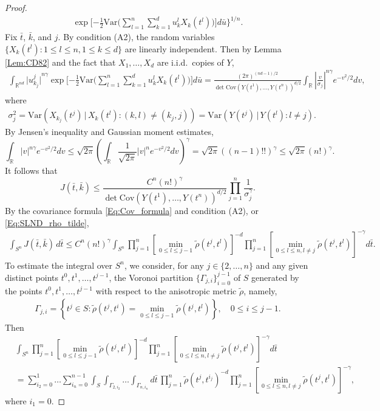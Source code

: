 \documentclass[11pt, reqno]{amsart}
\def\R{{\mathbb R}}
\numberwithin{equation}{section}
\begin{document}
\begin{proof}
\begin{align*}
\exp\Bigg[{-\frac{1}{2}\mathrm{Var}\Bigg(\sum_{l=1}^n\sum_{k=1}^d u_k^l X_k(t^l)\Bigg)}\Bigg] d\bar{u} \Bigg\}^{1/n}.
\end{align*}
Fix $\bar{t}$, $\bar{k}$, and $j$.
By condition (A2), the random variables $\{X_k(t^l) : 1 \le l \le n, 1 \le k \le d\}$ are linearly independent.
Then by Lemma \ref{Lem:CD82} and the fact that $X_1, \dots, X_d$ are i.i.d.~copies of $Y$,
\begin{align*}
\int_{\R^{nd}} {\big|u_{k_j}^j\big|}^{n\gamma} \exp\Bigg[{-\frac{1}{2}\mathrm{Var}\Bigg(\sum_{l=1}^n\sum_{k=1}^d u_k^l 
X_k(t^l)\Bigg)}\Bigg] d\bar{u}
= \frac{(2\pi)^{(nd-1)/2}}{\det \mathrm{Cov}(Y(t^1), \dots, Y(t^n))^{d/2}} 
\int_\R {\left|\frac{v}{\sigma_j}\right|}^{n\gamma} e^{-v^2/2} dv,
\end{align*}
where 
\begin{align*}
\sigma_j^2 = \mathrm{Var}\left(X_{k_j}(t^j) \,\big| \,X_k (t^l) : (k,l) \ne (k_j, j)\right) = \mathrm{Var}\left(Y(t^j)\, \big|\, Y(t^l) : l \ne j\right).
\end{align*}
By Jensen's inequality and Gaussian moment estimates,
\[ \int_\R |v|^{n\gamma} e^{-v^2/2} dv 
\le \sqrt{2\pi}\left( \int_\R  \frac{1}{\sqrt{2\pi}}|v|^n e^{-v^2/2} dv \right)^{\gamma} 
= \sqrt{2\pi} \left((n-1)!!\right)^\gamma \le \sqrt{2\pi} (n!)^\gamma. \]
It follows that
\begin{equation}\label{Eq:Bd_J}
 J(\bar{t}, \bar{k}) \le \frac{C^n (n!)^\gamma}{\det\mathrm{Cov}(Y(t^1), \dots, Y(t^n))^{d/2}} \prod_{j=1}^n \frac{1}{\sigma_j^\gamma}.
\end{equation}
By the covariance formula \eqref{Eq:Cov_formula} and condition (A2), or \eqref{Eq:SLND_rho_tilde},
\begin{align*}
\int_{S^n} J(\bar{t}, \bar{k}) \,d\bar{t} 
\le C^n (n!)^{\gamma} \int_{S^n} \prod_{j=1}^n \left[ \min_{0 \le l \le j-1} \tilde\rho(t^j, t^l)\right]^{-d} 
\prod_{j=1}^n \left[ \min_{0 \le l \le n, l \ne j} \tilde\rho(t^j, t^l)\right]^{-\gamma}  d\bar{t}.
\end{align*}
To estimate the integral over $S^n$, we consider, for any $j \in \{2, \dots, n\}$ and any given distinct points 
$t^0, t^1, \dots, t^{j-1}$, the Voronoi partition $\{ \Gamma_{j, i} \}_{i=0}^{j-1}$ of $S$ generated by the points 
$t^0, t^1, \dots, t^{j-1}$ with respect to the anisotropic metric $\tilde\rho$, namely,
\begin{align*}
\Gamma_{j, i} = \left\{ t^j \in S : \tilde\rho(t^j, t^i) = \min_{0 \le l \le j-1} \tilde\rho(t^j, t^l) \right\}, \quad 0 \le i \le j-1.
\end{align*}
Then
\begin{align*}
&\int_{S^n} \prod_{j=1}^n \left[ \min_{0 \le l \le j-1} \tilde\rho(t^j, t^l)\right]^{-d} \prod_{j=1}^n 
\left[ \min_{0 \le l \le n, l \ne j} \tilde\rho(t^j, t^l)\right]^{-\gamma}  d\bar{t}\\
& = \sum_{i_2=0}^1 \dots \sum_{i_n=0}^{n-1}\int_{S}  \int_{\Gamma_{2, i_2}} \dots  
\int_{\Gamma_{n, i_n}} d\bar{t} \, \prod_{j=1}^n \tilde\rho(t^j, t^{i_j})^{-d} \prod_{j=1}^{n}
 \left[ \min_{0 \le l \le n, l \ne j} \tilde\rho(t^j, t^l)\right]^{-\gamma},
\end{align*}
where $i_1 = 0$.


\end{proof}
\end{document}
